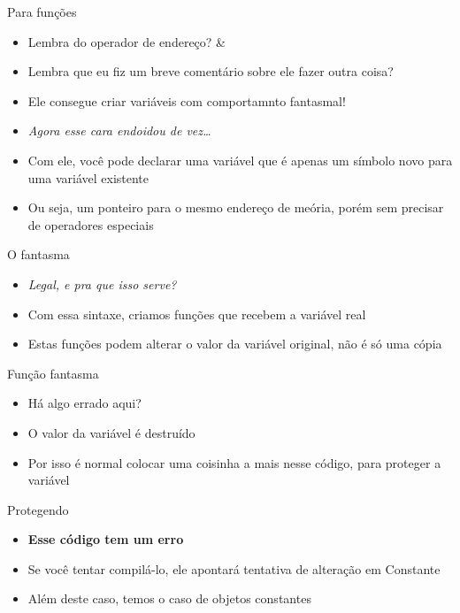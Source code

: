 \documentclass[14pt]{beamer}
\begin{document}
		\begin{frame}{Para funções}
			\begin{itemize}
				\presentationPause\item Lembra do operador de endereço? \presentationPause \&
				\presentationPause\item Lembra que eu fiz um breve comentário sobre ele fazer outra coisa?
				\presentationPause\item Ele consegue criar variáveis com comportamnto fantasmal!
				\presentationPause\item \textit{Agora esse cara endoidou de vez\dots}
				\presentationPause\item Com ele, você pode declarar uma variável que é apenas um símbolo novo para uma variável existente
				\presentationPause\item Ou seja, um ponteiro para o mesmo endereço de meória, porém sem precisar de operadores especiais
			\end{itemize}
		\end{frame}

		\begin{frame}{O fantasma}
			\presentationPause
			\begin{itemize}
				\presentationPause\item \textit{Legal, e pra que isso serve?}
				\presentationPause\item Com essa sintaxe, criamos funções que recebem a variável real
				\presentationPause\item Estas funções podem alterar o valor da variável original, não é só uma cópia
			\end{itemize}
		\end{frame}

		\begin{frame}{Função fantasma}
			\presentationPause
			\begin{itemize}
				\presentationPause\item Há algo errado aqui?
				\presentationPause\item O valor da variável é destruído
				\presentationPause\item Por isso é normal colocar uma coisinha a mais nesse código, para proteger a variável
			\end{itemize}
		\end{frame}

		\begin{frame}{Protegendo}
			\presentationPause
			\begin{itemize}
				\presentationPause\item \textbf{Esse código tem um erro}
				\presentationPause\item Se você tentar compilá-lo, ele apontará tentativa de alteração em Constante
				\presentationPause\item Além deste caso, temos o caso de objetos constantes
			\end{itemize}
		\end{frame}
\end{document}
